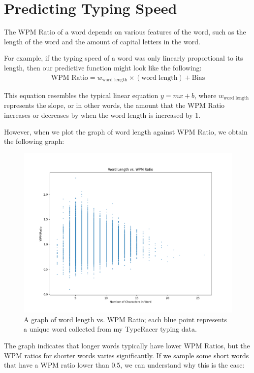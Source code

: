 \documentclass[12pt]{article}
\begin{document}
\section*{Predicting Typing Speed}

The WPM Ratio of a word depends on various features of the word, such as the length of the word and the amount of capital letters in the word.

For example, if the typing speed of a word was only linearly proportional to its length, then our predictive function might look like the following:
\begin{align*}
	\text{WPM Ratio} = w_{\text{word length}} \times (\text{word length}) + \text{Bias}
\end{align*}

This equation resembles the typical linear equation $y = mx + b$, where $w_{\text{word length}}$ represents the slope, or in other words, the amount that the WPM Ratio increases or decreases by when the word length is increased by 1.

However, when we plot the graph of word length against WPM Ratio, we obtain the following graph:

\begin{figure}[H]
	\caption{A graph of word length vs. WPM Ratio; each blue point represents a unique word collected from my TypeRacer typing data.}
	\includegraphics[width=\linewidth]{word-length-vs-wpm.png}
\end{figure}

The graph indicates that longer words typically have lower WPM Ratios, but the WPM ratios for shorter words varies significantly. If we sample some short words that have a WPM ratio lower than 0.5, we can understand why this is the case:
\end{document}
